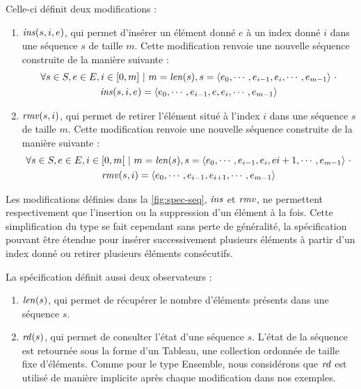 Celle-ci définit deux modifications :
\begin{enumerate}
  \item $\mathit{ins}(s,i,e)$, qui permet d'insérer un élément donné $e$ à un index donné $i$ dans une séquence $s$ de taille $m$.
    Cette modification renvoie une nouvelle séquence construite de la manière suivante :
    \begin{multline*}
      \forall s \in S, e \in E, i \in [0,m]~|~m = \mathit{len}(s),
      s = \langle e_0, \cdots, e_{i-1}, e_{i}, \cdots, e_{m-1} \rangle~\cdot \\
      \mathit{ins}(s,i,e) = \langle e_0, \cdots, e_{i-1}, e, e_{i}, \cdots, e_{m-1}  \rangle
    \end{multline*}
  \item $\mathit{rmv}(s,i)$, qui permet de retirer l'élément situé à l'index $i$ dans une séquence $s$ de taille $m$.
    Cette modification renvoie une nouvelle séquence construite de la manière suivante :
    \begin{multline*}
      \forall s \in S, e \in E, i \in [0,m[~|~m = \mathit{len}(s),
      s = \langle e_0, \cdots, e_{i-1}, e_{i}, e{i+1}, \cdots, e_{m-1} \rangle~\cdot \\
      \mathit{rmv}(s,i) = \langle e_0, \cdots, e_{i-1}, e_{i+1}, \cdots, e_{m-1}  \rangle
    \end{multline*}
\end{enumerate}
Les modifications définies dans la \autoref{fig:spec-seq}, $\mathit{ins}$ et $\mathit{rmv}$, ne permettent respectivement que l'insertion ou la suppression d'un élément à la fois.
Cette simplification du type se fait cependant sans perte de généralité, la spécification pouvant être étendue pour insérer successivement plusieurs éléments à partir d'un index donné ou retirer plusieurs éléments consécutifs.

La spécification définit aussi deux observateurs :
\begin{enumerate}
  \item $\mathit{len}(s)$, qui permet de récupérer le nombre d'éléments présents dans une séquence $s$.
  \item $\mathit{rd}(s)$, qui permet de consulter l'état d'une séquence $s$.
    L'état de la séquence est retournée sous la forme d'un Tableau, \ie une collection ordonnée de taille fixe d'éléments.
    Comme pour le type Ensemble, nous considérons que $\mathit{rd}$ est utilisé de manière implicite après chaque modification dans nos exemples.
\end{enumerate}

